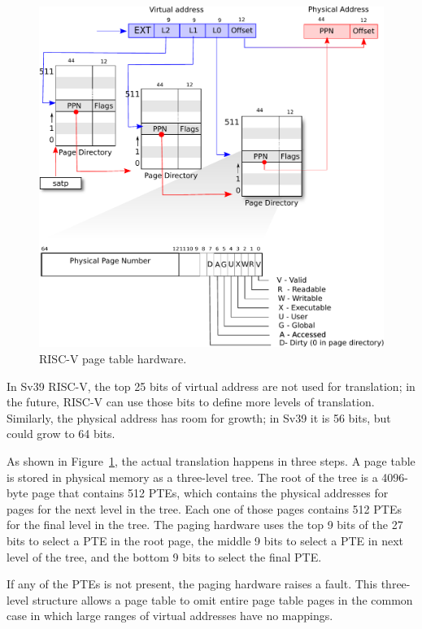 \begin{figure}[t]
\center
\includegraphics[scale=0.5]{fig/riscv_pagetable.pdf}
\caption{RISC-V page table hardware.}
\label{fig:riscv_pagetable}
\end{figure}

In Sv39 RISC-V, the top 25 bits of virtual address are not
used for translation; in the future, RISC-V can use those bits to
define more levels of translation.  Similarly, the physical address
has room for growth; in Sv39 it is 56 bits, but could grow to 64 bits.

As shown in
Figure~\ref{fig:riscv_pagetable},
the actual translation happens in three steps.  A page table is stored
in physical memory as a three-level tree.
The root of the tree is a
4096-byte page that contains 512 PTEs, which contains the physical
addresses for pages for the next level in the tree.  Each one of those
pages contains 512 PTEs for the final level in the tree.  The paging
hardware uses the top 9 bits of the 27 bits to select a PTE in the
root page, the middle 9 bits to select a PTE in next level of the
tree, and the bottom 9 bits to select the final PTE.

If any of the PTEs is not present, the paging hardware raises a fault.
This three-level structure allows a page table to omit entire page
table pages in the common case in which large ranges of virtual
addresses have no mappings.

